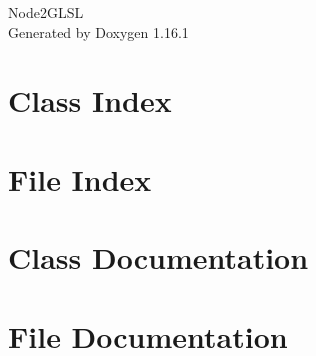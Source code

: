 \documentclass[twoside]{book}
\newcommand{\+}{\discretionary{\mbox{\scriptsize$\hookleftarrow$}}{}{}}
\newcommand{\clearemptydoublepage}{%
    \newpage{\pagestyle{empty}\cleardoublepage}%
  }
\begin{document}
  \raggedbottom
    \hypersetup{pageanchor=false,
                bookmarksnumbered=true,
                pdfencoding=unicode
               }
  \begin{titlepage}
  \vspace*{7cm}
  \begin{center}%
  {\Large Node2\+GLSL}\\
  \vspace*{1cm}
  {\large Generated by Doxygen 1.16.1}\\
  \end{center}
  \end{titlepage}
  \clearemptydoublepage
  \tableofcontents
  \clearemptydoublepage
  \hypersetup{pageanchor=true}
\chapter{Class Index}

\chapter{File Index}

\chapter{Class Documentation}


\chapter{File Documentation}

  \backmatter
  \newpage
  \clearemptydoublepage
  \printindex
\end{document}
